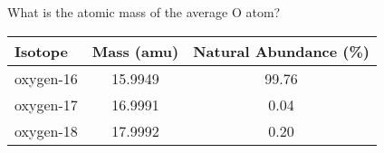 \documentclass[notes=only]{beamer}
\begin{document}

\begin{onyourown}%
	What is the atomic mass of the average O atom?

	\begin{center}
		\begin{tabular} {l S[table-format=2.4] S[table-format=2.2]}
			\toprule
			\bfseries Isotope & {\bfseries Mass (amu)} & {\bfseries Natural Abundance (\%)} \\
			\midrule
			oxygen-16 & 15.9949 & 99.76 \\
			oxygen-17 & 16.9991 & 0.04 \\
			oxygen-18 & 17.9992 & 0.20 \\
			\bottomrule
		\end{tabular}
	\end{center}
\end{onyourown}
\end{document}
